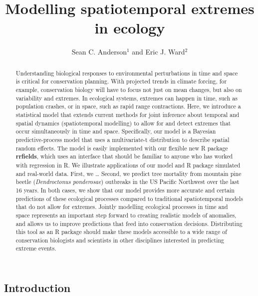 \documentclass[12pt,english]{article}
\title{Modelling spatiotemporal extremes in ecology}
\author{
Sean C. Anderson$^1$ and
Eric J. Ward$^2$
}
\date{}
\begin{document}
\maketitle

\begin{spacing}{1.05}

\begin{abstract}

Understanding biological responses to environmental perturbations in time and
space is critical for conservation planning. With projected trends in climate
forcing, for example, conservation biology will have to focus not just on mean
changes, but also on variability and extremes. In ecological systems, extremes
can happen in time, such as population crashes, or in space, such as rapid
range contractions. Here, we introduce a statistical model that extends current
methods for joint inference about temporal and spatial dynamics (spatiotemporal
modelling) to allow for and detect extremes that occur simultaneously in time
and space. Specifically, our model is a Bayesian predictive-process model that
uses a multivariate-t distribution to describe spatial random effects. The
model is easily implemented with our flexible new R package \textbf{rrfields},
which uses an interface that should be familiar to anyone who has worked with
regression in R. We illustrate applications of our model and R package simulated and
real-world data. First, we \ldots
Second, we predict tree mortality from mountain pine beetle (\emph{Dendroctonus
  ponderosae}) outbreaks in the US Pacific Northwest over the last 16 years. In
both cases, we show that our model provides more accurate and certain
predictions of these ecological processes compared to traditional
spatiotemporal models that do not allow for extremes. Jointly modelling
ecological processes in time and space represents an important step forward to
creating realistic models of anomalies, and allows us to improve predictions
that feed into conservation decisions. Distributing this tool as an R package
should make these models accessible to a wide range of conservation biologists
and scientists in other disciplines interested in predicting extreme events.
\end{abstract}

\section{Introduction}


\end{spacing}
\end{document}
